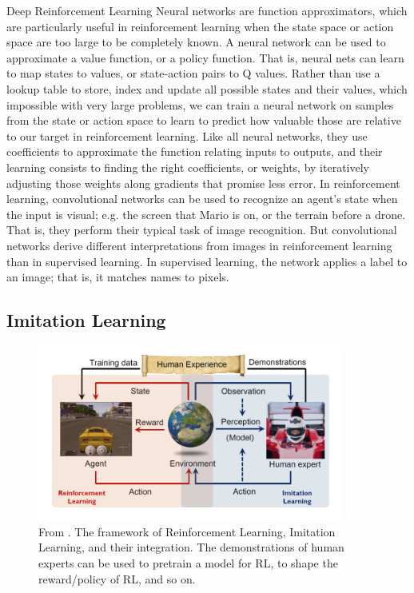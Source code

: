 Deep Reinforcement Learning
Neural networks are function approximators, which are particularly useful in reinforcement learning when the state space or action space are too large to be completely known.
A neural network can be used to approximate a value function, or a policy function. That is, neural nets can learn to map states to values, or state-action pairs to Q values. Rather than use a lookup table to store, index and update all possible states and their values, which impossible with very large problems, we can train a neural network on samples from the state or action space to learn to predict how valuable those are relative to our target in reinforcement learning.
Like all neural networks, they use coefficients to approximate the function relating inputs to outputs, and their learning consists to finding the right coefficients, or weights, by iteratively adjusting those weights along gradients that promise less error.
In reinforcement learning, convolutional networks can be used to recognize an agent’s state when the input is visual; e.g. the screen that Mario is on, or the terrain before a drone. That is, they perform their typical task of image recognition.
But convolutional networks derive different interpretations from images in reinforcement learning than in supervised learning. In supervised learning, the network applies a label to an image; that is, it matches names to pixels.







\subsection{Imitation Learning}
\begin{figure}[t]
 \centering
  \captionsetup{width=10cm}
  \includegraphics[width=10cm]{./img/cinesi}
  \caption{From \cite{cinesi}. The framework of Reinforcement Learning, Imitation Learning, and their integration. The demonstrations of human experts can be used to pretrain a model for RL, to shape the reward/policy of RL, and so on.}
   \label{fig:cinesi}
\end{figure}



